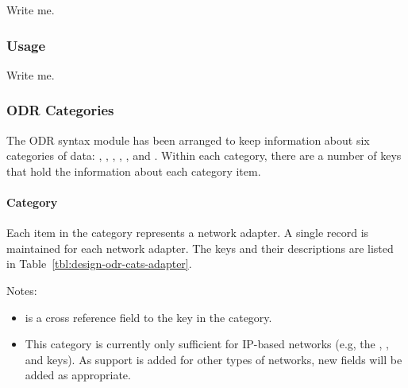 Write me.

\subsubsection{ Usage}

Write me.

\subsubsection{ODR Categories}

The ODR syntax module has been arranged to keep information about six
categories of data: , ,
, , , and 
. Within each category, there are a number of keys 
that hold the information about each category item.


\paragraph{ Category}

Each item in the  category represents a network
adapter. A single record is maintained for each network adapter.  The
keys and their descriptions are listed in
Table~\ref{tbl:design-odr-cats-adapter}.

Notes:

\begin{itemize}
\item {} is a cross reference field to the 
  key in the  category.
  
\item This category is currently only sufficient for IP-based networks
  (e.g, the , , and
   keys).  As support is added for other types of
  networks, new fields will be added as appropriate.
\end{itemize}

